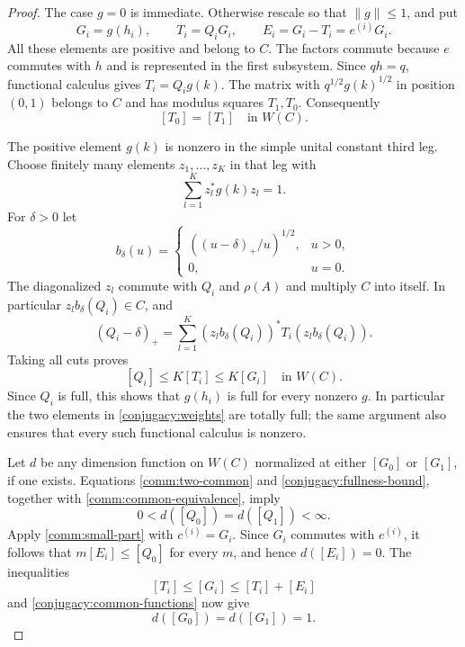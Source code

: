 \begin{proof}
The case $g=0$ is immediate.  Otherwise rescale so that
$\|g\|\leq1$, and put
\[
 G_i=g(h_i),\qquad T_i=Q_iG_i,\qquad E_i=G_i-T_i=e^{(i)}G_i.
\]
All these elements are positive and belong to $C$.  The factors
commute because $e$ commutes with $h$ and is represented in the
first subsystem.  Since $qh=q$, functional calculus gives
$T_i=Q_i g(k)$.  The matrix with
$q^{1/2}g(k)^{1/2}$ in position $(0,1)$ belongs to $C$ and has
modulus squares $T_1,T_0$.  Consequently
\begin{equation}\label{conjugacy:common-functions}
 [T_0]=[T_1]\quad\text{in }W(C).
\end{equation}

The positive element $g(k)$ is nonzero in the simple unital
constant third leg.  Choose finitely many elements
$z_1,\ldots,z_K$ in that leg with
\[
 \sum_{l=1}^K z_l^*g(k)z_l=1.
\]
For $\delta>0$ let
\[
 b_\delta(u)=
 \begin{cases}
 ((u-\delta)_+/u)^{1/2},&u>0,\\
 0,&u=0.
 \end{cases}
\]
The diagonalized $z_l$ commute with $Q_i$ and $\rho(A)$ and
multiply $C$ into itself.  In particular
$z_l b_\delta(Q_i)\in C$, and
\[
 (Q_i-\delta)_+
 =\sum_{l=1}^K
   (z_l b_\delta(Q_i))^*T_i(z_l b_\delta(Q_i)).
\]
Taking all cuts proves
\begin{equation}\label{conjugacy:fullness-bound}
 [Q_i]\leq K[T_i]\leq K[G_i]\quad\text{in }W(C).
\end{equation}
Since $Q_i$ is full, this shows that $g(h_i)$ is full for every
nonzero $g$.  In particular the two elements in
\eqref{conjugacy:weights} are totally full; the same argument
also ensures that every such functional calculus is nonzero.

Let $d$ be any dimension function on $W(C)$ normalized at either
$[G_0]$ or $[G_1]$, if one exists.  Equations
\eqref{comm:two-common} and
\eqref{conjugacy:fullness-bound}, together with
\eqref{comm:common-equivalence}, imply
\[
 0<d([Q_0])=d([Q_1])<\infty.
\]
Apply \eqref{comm:small-part} with $c^{(i)}=G_i$.
Since $G_i$ commutes with $e^{(i)}$, it follows that
$m[E_i]\leq[Q_0]$ for every $m$, and hence $d([E_i])=0$.
The inequalities
\[
 [T_i]\leq[G_i]\leq[T_i]+[E_i]
\]
and \eqref{conjugacy:common-functions} now give
\begin{equation}\label{conjugacy:dimension-equality}
 d([G_0])=d([G_1])=1.
\end{equation}


\end{proof}
